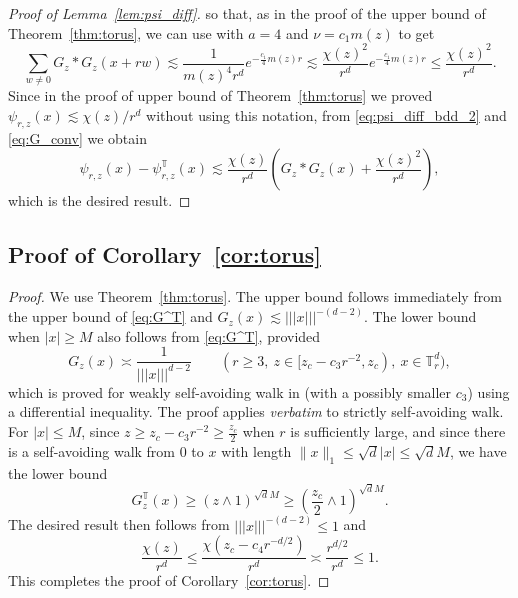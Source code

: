 \documentclass[11pt,hidelinks]{article}
\theoremstyle{plain}
\numberwithin{equation}{section}
\newcommand{\T}{\mathbb{T}}
\renewcommand{\(}{\left(}
\renewcommand{\)}{\right)}
\newcommand{\1}{\mathds{1}}
\providecommand{\abs}[1]{\lvert#1\rvert}
\providecommand{\norm}[1]{\lVert#1\rVert}
\newcommand{\mz}{m(z)}
\newcommand{\supT}{^{ \mathbb{T} }}
\newcommand{\subrz}{_{r,z}}
\newcommand{\rz}{{r,z}}
\newcommand{\veee}[1]{|\!|\!|#1|\!|\!|}
\providecommand{\nnnorm}[1]{\veee {#1} }
\begin{document}
\begin{proof}[Proof of Lemma~\ref{lem:psi_diff}]
so that, as in the proof of the upper bound of Theorem~\ref{thm:torus}, we can use \cite[Lemma~4.2]{HMS23} with $a=4$ and $\nu = c_1\mz$ to get
\begin{equation}
\label{eq:G_conv}
\sum_{w\ne0} G_z* G_z (x+rw)
\lesssim \frac 1 { \mz^4 r^d  } e^{-\frac {c_1} 4 \mz r }
\lesssim \frac{ \chi(z)^2 }{ r^d } e^{-\frac {c_1} 4 \mz r }
\le \frac{ \chi(z)^2 }{ r^d } .
\end{equation}
Since in the proof of upper bound of Theorem~\ref{thm:torus} we proved $\psi_\rz(x) \lesssim \chi(z) / r^d$ without using this notation, 
from \eqref{eq:psi_diff_bdd_2} and \eqref{eq:G_conv} we obtain
\begin{equation}
\psi\subrz(x) - \psi\subrz\supT(x) 
\lesssim \frac{ \chi(z) }{r^d} \( G_z * G_z(x) + \frac{ \chi(z)^2 }{ r^d } \), 
\end{equation}
which is the desired result.
\end{proof}


\subsection{Proof of Corollary~\ref{cor:torus}}
\label{sec:torus_cor}

\begin{proof}
We use Theorem~\ref{thm:torus}. 
The upper bound follows immediately from the upper bound of \eqref{eq:G^T} and $G_z(x) \lesssim \nnnorm x^{-(d-2)}$. 
The lower bound when $\abs x \ge M$ also follows from \eqref{eq:G^T}, 
provided 
\begin{equation} \label{eq:G_x}
G_z(x) \asymp \frac 1 {\nnnorm x^{d-2} }
\qquad (r\ge 3,\ z \in [z_c - c_3r^{-2}, z_c ), \ x\in \T^d_r ),
\end{equation}
which is proved for weakly self-avoiding walk in \cite[Remark~6.2]{Slad23_wsaw} (with a possibly smaller $c_3$) using a differential inequality. The proof applies \emph{verbatim} to strictly self-avoiding walk. 
For $\abs x \le M$, 
since $z \ge z_c - c_3r^{-2} \ge \frac{z_c}2$ when $r$ is sufficiently large,
and since there is a self-avoiding walk from $0$ to $x$ with length $\norm x _1 \le \sqrt d \abs x \le \sqrt d M$, we have the lower bound
\begin{equation}
G_z^\T(x) \ge (z \wedge 1 )^{\sqrt d M}
\ge \( \frac{z_c}2 \wedge 1 \)^{\sqrt d M} .
\end{equation} 
The desired result then follows from $\nnnorm x^{-(d-2)} \le 1$ and 
\begin{equation}
\frac{ \chi(z) }{ r^d }
\le \frac{ \chi(z_c - c_4 r^{-d/2}) }{ r^d }
\asymp \frac{ r^{d/2} }{ r^d  }\le 1.
\end{equation} 
This completes the proof of Corollary~\ref{cor:torus}.
\end{proof}
\end{document}
